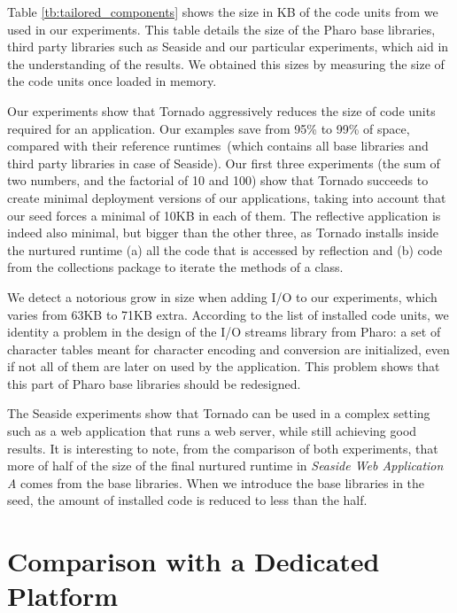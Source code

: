 Table \ref{tb:tailored_components} shows the size in KB of the code units from we used in our experiments. This table details the size of the Pharo base libraries, third party libraries such as Seaside and our particular experiments, which aid in the understanding of the results. We obtained this sizes by measuring the size of the code units once loaded in memory.

Our experiments show that Tornado aggressively reduces the size of code units required for an application. Our examples save from 95\% to 99\% of space, compared with their reference runtimes~(which contains all base libraries and third party libraries in case of Seaside). Our first three experiments (the sum of two numbers, and the factorial of 10 and 100) show that Tornado succeeds to create minimal deployment versions of our applications, taking into account that our seed forces a minimal of 10KB in each of them. The reflective application is indeed also minimal, but bigger than the other three, as Tornado installs inside the nurtured runtime (a) all the code that is accessed by reflection and (b) code from the collections package to iterate the methods of a class.

We detect a notorious grow in size when adding I/O to our experiments, which varies from 63KB to 71KB extra. According to the list of installed code units, we identity a problem in the design of the I/O streams library from Pharo: a set of character tables meant for character encoding and conversion are initialized, even if not all of them are later on used by the application. This problem shows that this part of Pharo base libraries should be redesigned.

The Seaside experiments show that Tornado can be used in a complex setting such as a web application that runs a web server, while still achieving good results. It is interesting to note, from the comparison of both experiments, that more of half of the size of the final nurtured runtime in \emph{Seaside Web Application A} comes from the base libraries. When we introduce the base libraries in the seed, the amount of installed code is reduced to less than the half.

\section{Comparison with a Dedicated Platform}

